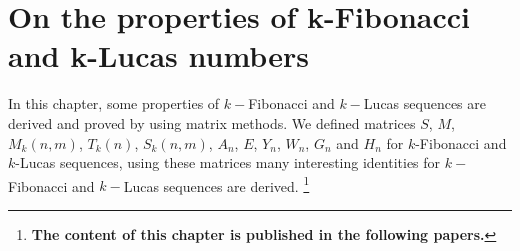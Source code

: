 %
%
\let\textcircled=\pgftextcircled
\chapter{On the properties of k-Fibonacci and k-Lucas numbers}
\label{chap:On the properties of k-Fibonacci and k-Lucas numbers}
In this chapter, some properties of $k-$Fibonacci and $k-$Lucas sequences are derived and proved by using matrix methods. We defined matrices $S$, $M$, $M_{k}(n,m)$, $T_{k}(n)$, $S_{k}{(n,m)}$, $A_{n}$, $E$, $Y_{n}$, $W_{n}$, $G_{n}$ and $H_{n}$ for $k$-Fibonacci and $k$-Lucas sequences, using these matrices many interesting identities for $k-$Fibonacci and $k-$Lucas sequences are derived.
\vspace{2mm}
\let\thefootnote\relax\footnote{\textbf{\hspace{-0.78cm}The content of this chapter is published in the following papers.}}

